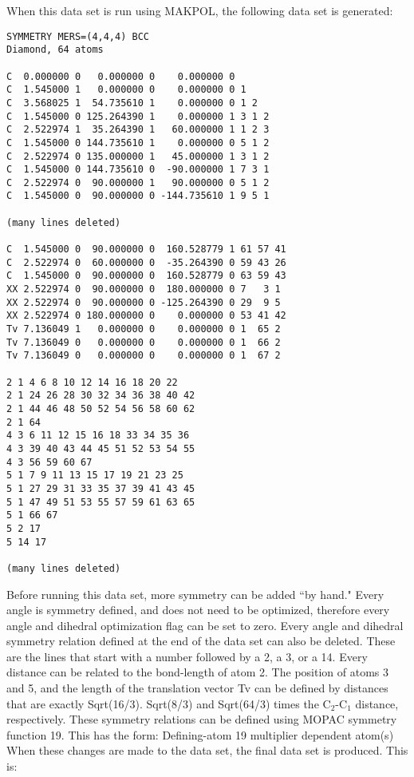 When this data set is run using MAKPOL, the following data set is 
generated: 
\begin{verbatim}
SYMMETRY MERS=(4,4,4) BCC 
Diamond, 64 atoms 

C  0.000000 0   0.000000 0    0.000000 0 
C  1.545000 1   0.000000 0    0.000000 0 1 
C  3.568025 1  54.735610 1    0.000000 0 1 2 
C  1.545000 0 125.264390 1    0.000000 1 3 1 2 
C  2.522974 1  35.264390 1   60.000000 1 1 2 3 
C  1.545000 0 144.735610 1    0.000000 0 5 1 2 
C  2.522974 0 135.000000 1   45.000000 1 3 1 2 
C  1.545000 0 144.735610 0  -90.000000 1 7 3 1 
C  2.522974 0  90.000000 1   90.000000 0 5 1 2 
C  1.545000 0  90.000000 0 -144.735610 1 9 5 1  

(many lines deleted) 

C  1.545000 0  90.000000 0  160.528779 1 61 57 41 
C  2.522974 0  60.000000 0  -35.264390 0 59 43 26
C  1.545000 0  90.000000 0  160.528779 0 63 59 43 
XX 2.522974 0  90.000000 0  180.000000 0 7   3 1 
XX 2.522974 0  90.000000 0 -125.264390 0 29  9 5 
XX 2.522974 0 180.000000 0    0.000000 0 53 41 42 
Tv 7.136049 1   0.000000 0    0.000000 0 1  65 2 
Tv 7.136049 0   0.000000 0    0.000000 0 1  66 2 
Tv 7.136049 0   0.000000 0    0.000000 0 1  67 2 

2 1 4 6 8 10 12 14 16 18 20 22
2 1 24 26 28 30 32 34 36 38 40 42
2 1 44 46 48 50 52 54 56 58 60 62
2 1 64
4 3 6 11 12 15 16 18 33 34 35 36
4 3 39 40 43 44 45 51 52 53 54 55
4 3 56 59 60 67
5 1 7 9 11 13 15 17 19 21 23 25
5 1 27 29 31 33 35 37 39 41 43 45
5 1 47 49 51 53 55 57 59 61 63 65
5 1 66 67
5 2 17
5 14 17

(many lines deleted) 

\end{verbatim}
Before running this data set, more symmetry can be added 
``by hand." Every angle is symmetry defined, and does not need to 
be optimized, therefore every angle and dihedral optimization flag 
can be set to zero. Every angle and dihedral symmetry relation 
defined at the end of the data set can also be deleted. These are 
the lines that start with a number followed by a 2, a 3, or a 14. 
Every distance can be related to the bond-length of atom 2. The 
position of atoms 3 and 5, and the length of the translation 
vector Tv can be defined by distances that are exactly Sqrt(16/3). 
Sqrt(8/3) and Sqrt(64/3) times the C$_2$-C$_1$ 
distance, respectively. These symmetry relations can be defined 
using MOPAC symmetry function 19. This has the form: Defining-atom 
19 multiplier dependent atom(s) When these changes are made to the 
data set, the final data set is produced. This is: 
